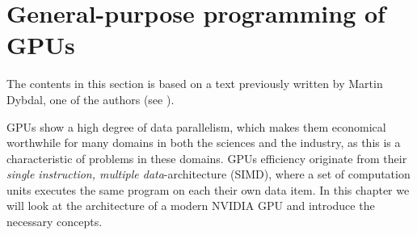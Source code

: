 \chapter{General-purpose programming of GPUs}
\label{chap:gpgpu}

The contents in this section is based on a text previously written by
Martin Dybdal, one of the authors (see \cite{dybdal2011opencl}).

GPUs show a high degree of data parallelism, which makes them
economical worthwhile for many domains in both the sciences and the
industry, as this is a characteristic of problems in these
domains. GPUs efficiency originate from their \textit{single
  instruction, multiple data}-architecture (SIMD), where a set of
computation units executes the same program on each their own data
item. In this chapter we will look at the architecture of a modern
NVIDIA GPU and introduce the necessary concepts.




